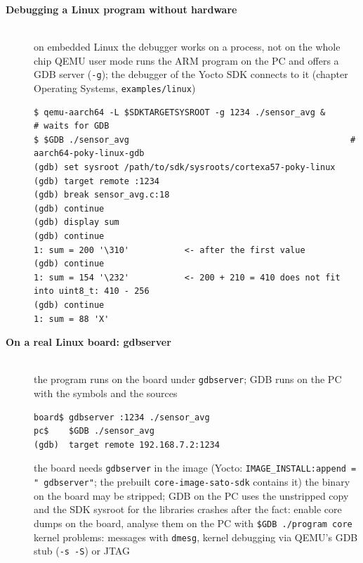 \begin{description}
\item[{\rot\bf Debugging a Linux program without hardware}]~\\
\bi
	\ite on embedded Linux the debugger works on a process, not on the whole chip
	\ite QEMU user mode runs the ARM program on the PC and offers a GDB server (\texttt{-g}); the debugger of the Yocto SDK connects to it (chapter Operating Systems, \texttt{examples/linux})
\ei
\begin{lstlisting}[language={}]
$ qemu-aarch64 -L $SDKTARGETSYSROOT -g 1234 ./sensor_avg &      # waits for GDB
$ $GDB ./sensor_avg                                            # aarch64-poky-linux-gdb
(gdb) set sysroot /path/to/sdk/sysroots/cortexa57-poky-linux
(gdb) target remote :1234
(gdb) break sensor_avg.c:18
(gdb) continue
(gdb) display sum
(gdb) continue
1: sum = 200 '\310'           <- after the first value
(gdb) continue
1: sum = 154 '\232'           <- 200 + 210 = 410 does not fit into uint8_t: 410 - 256
(gdb) continue
1: sum = 88 'X'
\end{lstlisting}
\os{\newpage}

\item[{\rot\bf On a real Linux board: gdbserver}]~\\[-\lblskip]
\bi
	\ite the program runs on the board under \texttt{gdbserver}; GDB runs on the PC with the symbols and the sources
\ei
\begin{lstlisting}[language={}]
board$ gdbserver :1234 ./sensor_avg
pc$    $GDB ./sensor_avg
(gdb)  target remote 192.168.7.2:1234
\end{lstlisting}
\bi
	\ite the board needs \texttt{gdbserver} in the image (Yocto: \texttt{IMAGE\_INSTALL:append = " gdbserver"}; the prebuilt \texttt{core-image-sato-sdk} contains it)
	\ite the binary on the board may be stripped; GDB on the PC uses the unstripped copy and the SDK sysroot for the libraries
	\ite crashes after the fact: enable core dumps on the board, analyse them on the PC with \texttt{\$GDB ./program core}
	\ite kernel problems: messages with \texttt{dmesg}, kernel debugging via QEMU's GDB stub (\texttt{-s -S}) or JTAG
\ei
\os{\newpage}


\end{description}
